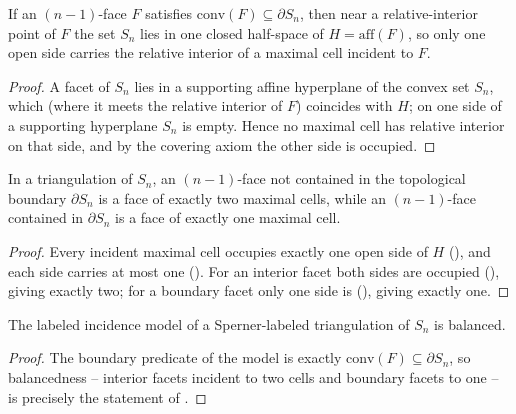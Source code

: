 \begin{lemma}
    \label{lem:boundary-facet-one-side}
    If an $(n-1)$-face $F$ satisfies $\mathrm{conv}(F) \subseteq \partial S_n$,
    then near a relative-interior point of $F$ the set $S_n$ lies in one closed
    half-space of $H = \mathrm{aff}(F)$, so only one open side carries the
    relative interior of a maximal cell incident to $F$.
\end{lemma}
\begin{proof}
    A facet of $S_n$ lies in a supporting affine hyperplane of the convex set
    $S_n$, which (where it meets the relative interior of $F$) coincides with
    $H$; on one side of a supporting hyperplane $S_n$ is empty. Hence no maximal
    cell has relative interior on that side, and by the covering axiom the other
    side is occupied.
\end{proof}

\begin{lemma}
    \label{lem:door-incidence}
    In a triangulation of $S_n$, an $(n-1)$-face not contained in the topological
    boundary $\partial S_n$ is a face of exactly two maximal cells, while an
    $(n-1)$-face contained in $\partial S_n$ is a face of exactly one maximal
    cell.
\end{lemma}
\begin{proof}
    Every incident maximal cell occupies exactly one open side of $H$
    (), and each side carries at most one
    (). For an interior facet both sides are occupied
    (), giving exactly two; for a boundary
    facet only one side is (), giving exactly
    one.
\end{proof}

\begin{lemma}
    \label{lem:triangulation-model-balanced}
    \leanok
    The labeled incidence model of a Sperner-labeled triangulation of $S_n$ is
    balanced.
\end{lemma}
\begin{proof}
    The boundary predicate of the model is exactly $\mathrm{conv}(F) \subseteq
    \partial S_n$, so balancedness -- interior facets incident to two cells and
    boundary facets to one -- is precisely the statement of
    .
\end{proof}

